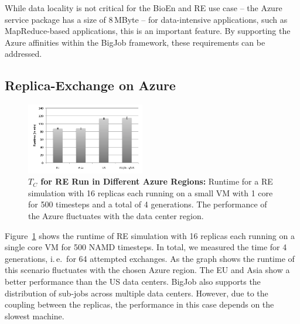 \documentclass[conference,final]{IEEEtran}
\newcommand{\tc}{$T_{C}$ }
\begin{document}
While data locality is not critical for the BioEn and RE use case --
the Azure service package has a size of 8\,MByte -- for data-intensive
applications, such as MapReduce-based applications, this is an important
feature. By supporting the Azure affinities within the BigJob framework,
these requirements can be addressed.

\subsection{Replica-Exchange on Azure}

\begin{figure}[htbp]
    \centering
        \includegraphics[width=0.46\textwidth]{performance/repex_runtime_per_region.pdf}
    \caption{\textbf{\tc for RE Run in Different Azure Regions:} Runtime for a RE simulation with 
    16 replicas each running on a small VM with 1 core for 500 timesteps and a total of 4 generations. The performance of
    the Azure fluctuates with the data center region. }
    \label{fig:performance_repex_runtime_per_region}
\end{figure}

Figure~\ref{fig:performance_repex_runtime_per_region} shows the runtime of RE simulation
with 16 replicas each running on a single core VM for 500 NAMD timesteps. In total, we measured
the time for 4 generations, i.\,e.\ for 64 attempted exchanges. As the graph shows the runtime
of this scenario fluctuates with the chosen Azure region. The EU and Asia show a better performance
than the US data centers. BigJob also supports the distribution of sub-jobs across multiple data 
centers. However, due to the coupling between the replicas, the performance in this case
depends on the slowest machine.
\end{document}
